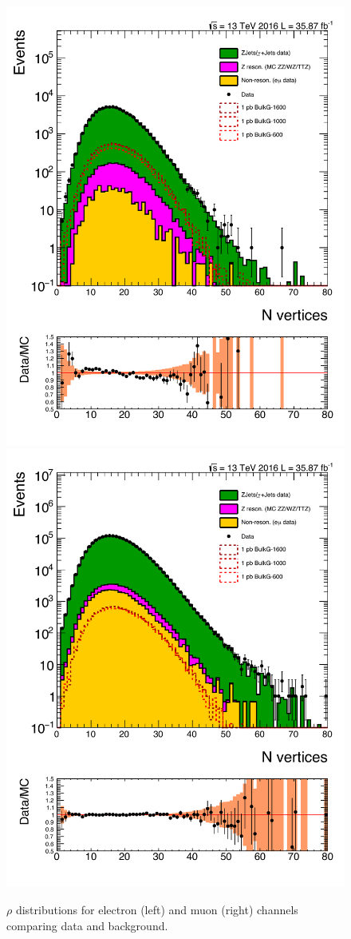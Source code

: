\begin{figure}[htbp!]
\centering
\includegraphics[width=0.46\linewidth, page=2]{figures/ReMiniSummer16_DT_PhReMiniMCRcFixXsec_GMCPhPtWt_tightzpt50_puWeightsummer16_muoneg_gjet_metfilter_unblind_el_log_1pb.pdf}
\includegraphics[width=0.46\linewidth, page=2]{figures/ReMiniSummer16_DT_PhReMiniMCRcFixXsec_GMCPhPtWt_tightzpt50_puWeightsummer16_muoneg_gjet_metfilter_unblind_mu_log_1pb.pdf}
\caption{$\rho$ distributions for electron (left) and muon (right)
channels comparing data and background.}
\label{fig:gjet_rho}
\end{figure}

